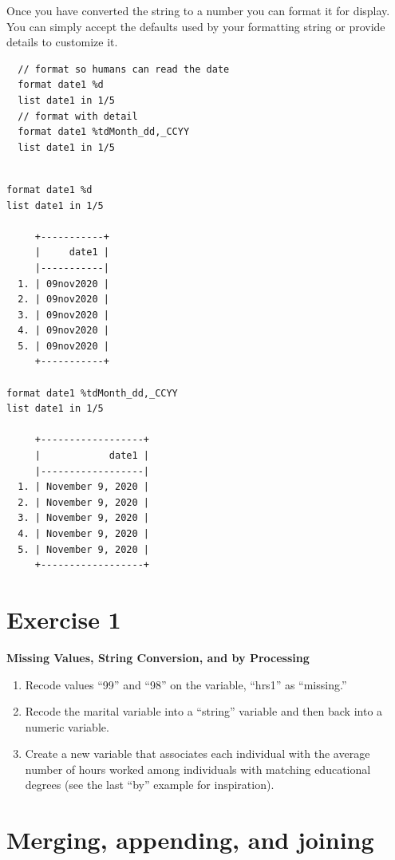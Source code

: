 \documentclass[]{book}
\providecommand{\tightlist}{%
  \setlength{\itemsep}{0pt}\setlength{\parskip}{0pt}}
\begin{document}
Once you have converted the string to a number you can format it for
display. You can simply accept the defaults used by your formatting
string or provide details to customize it.

\begin{verbatim}
  // format so humans can read the date
  format date1 %d
  list date1 in 1/5
  // format with detail
  format date1 %tdMonth_dd,_CCYY
  list date1 in 1/5
\end{verbatim}

\begin{verbatim}

format date1 %d
list date1 in 1/5

     +-----------+
     |     date1 |
     |-----------|
  1. | 09nov2020 |
  2. | 09nov2020 |
  3. | 09nov2020 |
  4. | 09nov2020 |
  5. | 09nov2020 |
     +-----------+

format date1 %tdMonth_dd,_CCYY
list date1 in 1/5

     +------------------+
     |            date1 |
     |------------------|
  1. | November 9, 2020 |
  2. | November 9, 2020 |
  3. | November 9, 2020 |
  4. | November 9, 2020 |
  5. | November 9, 2020 |
     +------------------+
\end{verbatim}

\section{Exercise 1}\label{exercise-1-4}

\textbf{Missing Values, String Conversion, and by Processing}

\begin{enumerate}
\def\labelenumi{\arabic{enumi}.}
\tightlist
\item
  Recode values ``99'' and ``98'' on the variable, ``hrs1'' as
  ``missing.''
\item
  Recode the marital variable into a ``string'' variable and then back
  into a numeric variable.
\item
  Create a new variable that associates each individual with the average
  number of hours worked among individuals with matching educational
  degrees (see the last ``by'' example for inspiration).
\end{enumerate}

\section{Merging, appending, and
joining}\label{merging-appending-and-joining}
\end{document}
